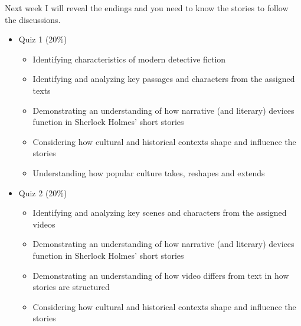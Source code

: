 \documentclass[a4paper,landscape,headrule,footrule,xetex,25pt]{foils}
\begin{document}
Next week I will reveal the endings and you need to know the stories to follow the discussions.

\begin{itemize}
\item Quiz 1 (20\%)
  \begin{itemize}
  \item     Identifying characteristics of modern detective fiction
  \item     Identifying and analyzing key passages and characters from the assigned texts
  \item     Demonstrating an understanding of how narrative (and literary) devices function in Sherlock Holmes’ short stories
  \item     Considering how cultural and historical contexts shape and influence the stories
  \item     Understanding how popular culture takes, reshapes and extends 
  \end{itemize}
\newpage
\item   Quiz 2 (20\%)
  \begin{itemize}
  \item      Identifying and analyzing key scenes and characters from the assigned videos
  \item     Demonstrating an understanding of how narrative (and literary) devices function in Sherlock Holmes’ short stories
  \item     Demonstrating an understanding of how video differs from text in how stories are structured
  \item     Considering how cultural and historical contexts shape and influence the stories 
  \end{itemize}
\end{itemize}


\end{document}
